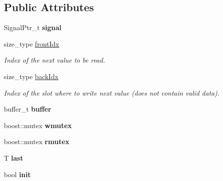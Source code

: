 \subsection*{Public Attributes}
\begin{DoxyCompactItemize}
\item 
\mbox{\label{structdynamic__graph_1_1internal_1_1BindedSignal_aa0b8c4e3dcea8585de50697b892ea0a4}} 
Signal\+Ptr\+\_\+t {\bfseries signal}
\item 
\mbox{\label{structdynamic__graph_1_1internal_1_1BindedSignal_af90b4e3d1f26e7525f51e0903c17a37f}} 
size\+\_\+type \hyperlink{structdynamic__graph_1_1internal_1_1BindedSignal_af90b4e3d1f26e7525f51e0903c17a37f}{front\+Idx}
\begin{DoxyCompactList}\small\item\em Index of the next value to be read. \end{DoxyCompactList}\item 
size\+\_\+type \hyperlink{structdynamic__graph_1_1internal_1_1BindedSignal_a93b1cf4373c6271937f535a68334c523}{back\+Idx}
\begin{DoxyCompactList}\small\item\em Index of the slot where to write next value (does not contain valid data). \end{DoxyCompactList}\item 
\mbox{\label{structdynamic__graph_1_1internal_1_1BindedSignal_aefa6f66d4def9aa5353335c035c1d716}} 
buffer\+\_\+t {\bfseries buffer}
\item 
\mbox{\label{structdynamic__graph_1_1internal_1_1BindedSignal_ad3b9957dafb9684643caacbdc2739c38}} 
boost\+::mutex {\bfseries wmutex}
\item 
\mbox{\label{structdynamic__graph_1_1internal_1_1BindedSignal_a25a7206b3a9904d4cccd226bd885e232}} 
boost\+::mutex {\bfseries rmutex}
\item 
\mbox{\label{structdynamic__graph_1_1internal_1_1BindedSignal_a23688c234ce0c8935ed3f52783fa9f2a}} 
T {\bfseries last}
\item 
\mbox{\label{structdynamic__graph_1_1internal_1_1BindedSignal_ac2169fa9a731a30f66805c53af7f55eb}} 
bool {\bfseries init}
\end{DoxyCompactItemize}


